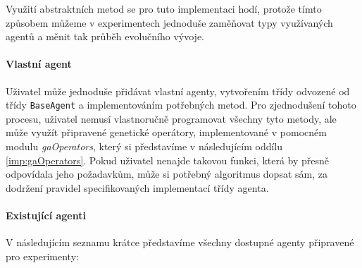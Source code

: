 Využití abstraktních metod se pro tuto implementaci hodí, protože tímto
způsobem můžeme v experimentech jednoduše zaměňovat typy využívaných
agentů a měnit tak průběh evolučního vývoje. 

\paragraph{Vlastní agent}
Uživatel může jednoduše přidávat vlastní agenty, vytvořením třídy odvozené
od třídy \texttt{BaseAgent} a implementováním potřebných metod. Pro
zjednodušení tohoto procesu, uživatel nemusí vlastnoručně programovat všechny
tyto metody, ale může využít připravené genetické operátory, implementované v
pomocném modulu \emph{gaOperators}, který si představíme v následujícím oddílu
\ref{imp:gaOperators}. Pokud uživatel nenajde takovou funkci, která by přesně
odpovídala jeho požadavkům, může si potřebný algoritmus dopsat sám, za dodržení
pravidel specifikovaných implementací třídy agenta.

\paragraph{Existující agenti}
V následujícím seznamu krátce představíme všechny dostupné agenty připravené
pro experimenty:


